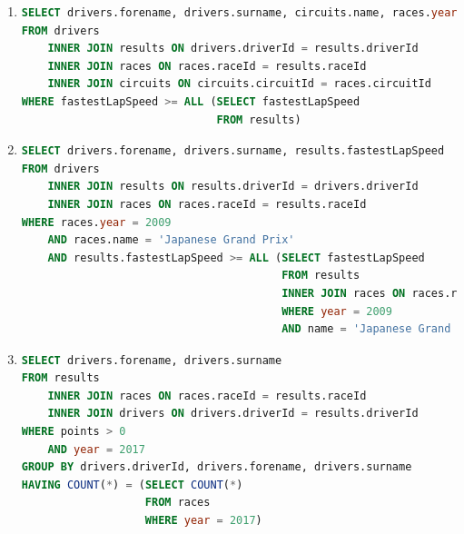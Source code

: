 \documentclass{db-practice}
\begin{document}
\begin{enumerate}
\item
\begin{lstlisting}[language=SQL]
SELECT drivers.forename, drivers.surname, circuits.name, races.year, results.fastestLapSpeed
FROM drivers
    INNER JOIN results ON drivers.driverId = results.driverId
    INNER JOIN races ON races.raceId = results.raceId
    INNER JOIN circuits ON circuits.circuitId = races.circuitId
WHERE fastestLapSpeed >= ALL (SELECT fastestLapSpeed
                              FROM results)
\end{lstlisting}

\item
\begin{lstlisting}[language=SQL]
SELECT drivers.forename, drivers.surname, results.fastestLapSpeed
FROM drivers
    INNER JOIN results ON results.driverId = drivers.driverId
    INNER JOIN races ON races.raceId = results.raceId
WHERE races.year = 2009
    AND races.name = 'Japanese Grand Prix'
    AND results.fastestLapSpeed >= ALL (SELECT fastestLapSpeed
                                        FROM results
                                        INNER JOIN races ON races.raceId = results.raceId
                                        WHERE year = 2009
                                        AND name = 'Japanese Grand Prix')
\end{lstlisting}
        
\item
\begin{lstlisting}[language=SQL]
SELECT drivers.forename, drivers.surname
FROM results
    INNER JOIN races ON races.raceId = results.raceId
    INNER JOIN drivers ON drivers.driverId = results.driverId
WHERE points > 0
    AND year = 2017
GROUP BY drivers.driverId, drivers.forename, drivers.surname
HAVING COUNT(*) = (SELECT COUNT(*)
                   FROM races
                   WHERE year = 2017)
\end{lstlisting}


\end{enumerate}
\end{document}
